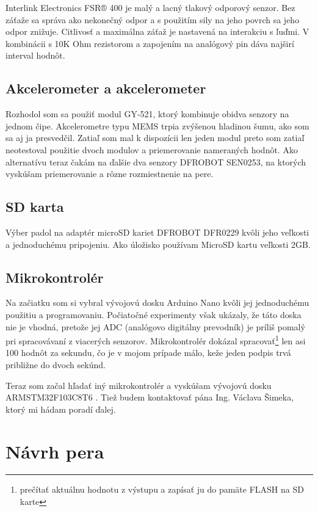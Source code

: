 Interlink Electronics FSR® 400 je malý a lacný tlakový odporový senzor. Bez záťaže sa správa ako nekonečný odpor a s použitím sily na jeho povrch sa jeho odpor znižuje. Citlivosť a maximálna záťaž je nastavená na interakciu s ľuďmi. \cite{fsr400}
V kombinácii s 10K Ohm rezistorom a zapojením na analógový pin dáva najširí interval hodnôt.

\subsection*{Akcelerometer a akcelerometer}

Rozhodol som sa použiť modul GY-521, ktorý kombinuje obidva senzory na jednom čipe. Akcelerometre typu MEMS trpia zvýšenou hladinou šumu\cite{PawlusJan2019Zpns}, ako som sa aj ja presvedčil. Zatiaľ som mal k dispozícii len jeden modul preto som zatiaľ neotestoval použitie dvoch modulov a priemerovanie nameraných hodnôt. Ako alternatívu teraz čakám na ďalšie dva senzory DFROBOT SEN0253\cite{PohybovySenzor}, na ktorých vyskúšam priemerovanie a rôzne rozmiestnenie na pere.

\subsection*{SD karta}

Výber padol na adaptér microSD kariet DFROBOT DFR0229 kvôli jeho veľkosti a jednoduchému pripojeniu. Ako úložisko používam MicroSD kartu veľkosti 2GB. 

\subsection*{Mikrokontrolér}

Na začiatku som si vybral vývojovú dosku Arduino Nano kvôli jej jednoduchému použitiu a programovaniu. 
Počiatočné experimenty však ukázaly, že táto doska nie je vhodná, pretože jej ADC (analógovo digitálny prevodník) je príliš pomalý pri spracovávaní z viacerých senzorov. Mikrokontrolér dokázal spracovať\footnote{prečítať aktuálnu hodnotu z výstupu a zapísať ju do pamäte FLASH na SD karte} len asi 100 hodnôt za sekundu, čo je v mojom prípade málo, keže jeden podpis trvá približne do dvoch sekúnd.

Teraz som začal hľadať iný mikrokontrolér a vyskúšam vývojovú dosku ARMSTM32F103C8T6 \cite{ArduinoARM}. Tiež budem kontaktovať pána Ing. Václava Šimeka, ktorý mi hádam poradí ďalej.


\section{Návrh pera}

